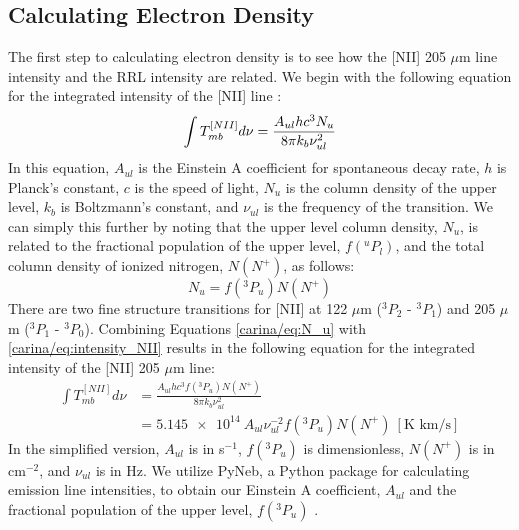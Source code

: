 \subsection{Calculating Electron Density}
The first step to calculating electron density is to see how the [NII] 205 $\mu$m line intensity and the RRL intensity are related.
We begin with the following equation for the integrated intensity of the [NII] line \parencite{pineda2019electron}:
\begin{equation}
    \label{carina/eq:intensity_NII}
    \int{T_{mb}^{[NII]}} d\nu = \frac{A_{ul}hc^3N_u}{8\pi k_b \nu_{ul}^2}\\
\end{equation}
In this equation, $A_{ul}$ is the Einstein A coefficient for spontaneous decay rate, $h$ is Planck's constant, $c$ is the speed of light, $N_u$ is the column density of the upper level, $k_b$ is Boltzmann's constant, and $\nu_{ul}$ is the frequency of the transition.
We can simply this further by noting that the upper level column density, $N_u$, is related to the fractional population of the upper level, $f(^uP_l)$, and the total column density of ionized nitrogen, $N(N^+)$, as follows:
\begin{equation}
    N_u = f(^3P_u) N(N^+)
    \label{carina/eq:N_u}
\end{equation}
There are two fine structure transitions for [NII] at 122 $\mu$m ($^3P_2$ - $^3P_1$) and 205 $\mu$m ($^3P_1$ - $^3P_0$).
Combining Equations \ref{carina/eq:N_u} with \ref{carina/eq:intensity_NII} results in the following equation for the integrated intensity of the [NII] 205 $\mu$m line:
\begin{align}
    \int{T_{mb}^{[NII]}} d\nu &= \frac{A_{ul}hc^3f(^3P_u)N(N^+)}{8\pi k_b \nu_{ul}^2} \\
    &= \num{5.145e14}\ A_{ul}\nu_{ul}^{-2}f(^3P_u)N(N^+)\ [\text{K km/s}]
    \label{carina/eq:intensity_NII_final}
\end{align}
In the simplified version, $A_{ul}$ is in s$^{-1}$, $f(^3P_u)$ is dimensionless, $N(N^+)$ is in cm$^{-2}$, and $\nu_{ul}$ is in Hz.
We utilize PyNeb, a Python package for calculating emission line intensities, to obtain our Einstein A coefficient, $A_{ul}$ and the fractional population of the upper level, $f(^3P_u)$ \parencite{luridiana2015pyneb, froese2004breit,7288EL, tayal2011electron}.


